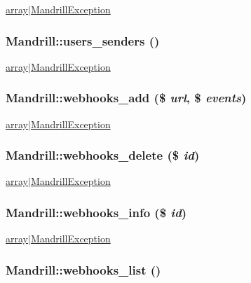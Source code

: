 \label{classMandrill_a589e70d0e68483c711ce6279e124bfc3}
\hyperlink{}{array$|$MandrillException }\hypertarget{classMandrill_a719dc7de06da90674792f38b03ff00f9}{
\subsubsection[{users\_\-senders}]{\setlength{\rightskip}{0pt plus 5cm}Mandrill::users\_\-senders ()}}
\label{classMandrill_a719dc7de06da90674792f38b03ff00f9}
\hyperlink{}{array$|$MandrillException }\hypertarget{classMandrill_adaaf77ceabe8df995f9d70292bf9f0d5}{
\subsubsection[{webhooks\_\-add}]{\setlength{\rightskip}{0pt plus 5cm}Mandrill::webhooks\_\-add (\$ {\em url}, \/  \$ {\em events})}}
\label{classMandrill_adaaf77ceabe8df995f9d70292bf9f0d5}
\hyperlink{}{array$|$MandrillException }\hypertarget{classMandrill_a6cd5f72008311d3f969963e4daa72666}{
\subsubsection[{webhooks\_\-delete}]{\setlength{\rightskip}{0pt plus 5cm}Mandrill::webhooks\_\-delete (\$ {\em id})}}
\label{classMandrill_a6cd5f72008311d3f969963e4daa72666}
\hyperlink{}{array$|$MandrillException }\hypertarget{classMandrill_a2ee739c6d858cc0cbb9a4e9656c07ad2}{
\subsubsection[{webhooks\_\-info}]{\setlength{\rightskip}{0pt plus 5cm}Mandrill::webhooks\_\-info (\$ {\em id})}}
\label{classMandrill_a2ee739c6d858cc0cbb9a4e9656c07ad2}
\hyperlink{}{array$|$MandrillException }\hypertarget{classMandrill_a021fbb76c0635e5e97ecac14d65e72a6}{
\subsubsection[{webhooks\_\-list}]{\setlength{\rightskip}{0pt plus 5cm}Mandrill::webhooks\_\-list ()}}
